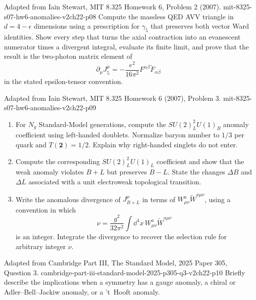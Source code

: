 \begin{enumerate}
  {Adapted from Iain Stewart, MIT 8.325 Homework 6, Problem 2 (2007).}
  {mit-8325-s07-hw6-anomalies-v2ch22-p08}
  Compute the massless QED AVV triangle in
  \(d=4-\epsilon\) dimensions using a prescription for \(\gamma_5\) that
  preserves both vector Ward identities.  Show every step that turns the
  axial contraction into an evanescent numerator times a divergent
  integral, evaluate its finite limit, and prove that the result is the
  two-photon matrix element of
  \[
    \partial_\mu J^\mu_5
      =-\frac{e^2}{16\pi^2}F^{\alpha\beta}\widetilde F_{\alpha\beta}
  \]
  in the stated epsilon-tensor convention.

  {Adapted from Iain Stewart, MIT 8.325 Homework 6 (2007),
  Problem 3.}
  {mit-8325-s07-hw6-anomalies-v2ch22-p09}
  \begin{enumerate}
    \item[(a)]
    For \(N_g\) Standard-Model generations, compute the
    \(SU(2)_L^2U(1)_B\) anomaly coefficient using left-handed doublets.
    Normalize baryon number to \(1/3\) per quark and
    \(T(\mathbf2)=1/2\).  Explain why right-handed singlets do not enter.
    \item[(b)]
    Compute the corresponding \(SU(2)_L^2U(1)_L\) coefficient and show
    that the weak anomaly violates \(B+L\) but preserves \(B-L\).
    State the changes \(\Delta B\) and \(\Delta L\) associated with a
    unit electroweak topological transition.
    \item[(c)]
    Write the anomalous divergence of \(J^\mu_{B+L}\) in terms of
    \(W^a_{\mu\nu}\widetilde W^{a\mu\nu}\), using a convention in which
    \[
      \nu=\frac{g^2}{32\pi^2}
        \int \dd^4x\,W^a_{\mu\nu}\widetilde W^{a\mu\nu}
    \]
    is an integer.  Integrate the divergence to recover the selection
    rule for arbitrary integer \(\nu\).
  \end{enumerate}

  {Adapted from Cambridge Part III, The Standard Model, 2025 Paper 305,
  Question 3.}
  {cambridge-part-iii-standard-model-2025-p305-q3-v2ch22-p10}
  Briefly describe the implications when a symmetry has a gauge anomaly, a
  chiral or Adler--Bell--Jackiw anomaly, or a 't~Hooft anomaly.


\end{enumerate}
